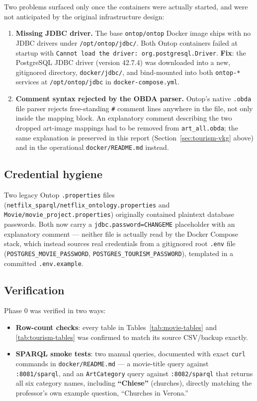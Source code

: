 \documentclass[11pt,a4paper]{article}
\newcommand{\code}[1]{\texttt{#1}}
\begin{document}
Two problems surfaced only once the containers were actually started, and were not anticipated
by the original infrastructure design:

\begin{enumerate}
    \item \textbf{Missing JDBC driver.} The base \code{ontop/ontop} Docker image ships with no
        JDBC drivers under \code{/opt/ontop/jdbc/}. Both Ontop containers failed at startup with
        \code{Cannot load the driver: org.postgresql.Driver}. \textbf{Fix}: the PostgreSQL JDBC
        driver (version 42.7.4) was downloaded into a new, gitignored directory,
        \code{docker/jdbc/}, and bind-mounted into both \code{ontop-*} services at
        \code{/opt/ontop/jdbc} in \code{docker-compose.yml}.
    \item \textbf{Comment syntax rejected by the OBDA parser.} Ontop's native \code{.obda} file
        parser rejects free-standing \code{\#} comment lines anywhere in the file, not only
        inside the mapping block. An explanatory comment describing the two dropped art-image
        mappings had to be removed from \code{art\_all.obda}; the same explanation is preserved
        in this report (Section~\ref{sec:tourism-vkg} above) and in the operational
        \code{docker/README.md} instead.
\end{enumerate}

\subsection{Credential hygiene}

Two legacy Ontop \code{.properties} files (\code{netfilx\_sparql\slash{}netflix\_ontology.properties}
and \code{Movie\slash{}movie\_project.properties}) originally contained plaintext database passwords.
Both now carry a \code{jdbc.password=CHANGEME} placeholder with an explanatory comment ---
neither file is actually read by the Docker Compose stack, which instead sources real
credentials from a gitignored root \code{.env} file (\code{POSTGRES\_MOVIE\_PASSWORD},
\code{POSTGRES\_TOURISM\_PASSWORD}), templated in a committed \code{.env.example}.

\subsection{Verification}

Phase 0 was verified in two ways:

\begin{itemize}
    \item \textbf{Row-count checks}: every table in Tables~\ref{tab:movie-tables} and
        \ref{tab:tourism-tables} was confirmed to match its source CSV/backup exactly.
    \item \textbf{SPARQL smoke tests}: two manual queries, documented with exact \code{curl}
        commands in \code{docker/README.md} --- a movie-title query against
        \code{:8081/sparql}, and an \code{ArtCategory} query against \code{:8082/sparql} that
        returns all six category names, including \textbf{``Chiese''} (churches), directly
        matching the professor's own example question, ``Churches in Verona.''
\end{itemize}
\end{document}
